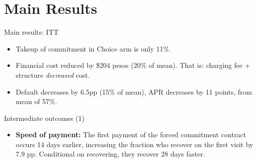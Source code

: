 \documentclass[8pt]{beamer}
\begin{document}
\section{Main Results}
\begin{frame}{Main results: ITT}
\label{main_results}


\begin{itemize}
    \item  Takeup of commitment in Choice arm is only 11\%.
    \item Financial cost reduced by \$204 pesos (20\% of mean). That is: charging fee + structure \textit{decreased} cost.
    \item Default decreases by 6.5pp (15\% of mean), APR decreases by 11 points, from mean of 57\%.
\end{itemize}
\vspace{.3in}
\begin{table}[H]
\begin{center}
\resizebox{0.95\textwidth}{!}{
\small{}
}
\end{center}
\end{table}

   \vfill 

\end{frame}








\begin{frame}{Intermediate outcomes (1)}
\label{mechanism_appendix}

\begin{table}[H]
\caption{Intermediate outcomes}
\begin{center}
\scriptsize{}
\end{center}
\end{table}
\vfill
 \begin{itemize}
     \item \textbf{Speed of payment:} The first payment of the forced commitment contract  occurs 14 days earlier, increasing the fraction who recover on the first visit by 7.9 pp. Conditional on recovering, they recover 28 days faster.
\end{itemize}
\end{frame}
\end{document}
